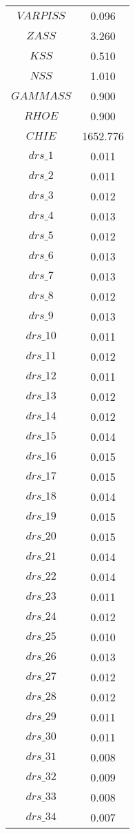 \begin{center}
\begin{longtable}{cc}
$VARPISS$ 	 & 	 0.096 \\
$ZASS$ 	 & 	 3.260 \\
$KSS$ 	 & 	 0.510 \\
$NSS$ 	 & 	 1.010 \\
$GAMMASS$ 	 & 	 0.900 \\
$RHOE$ 	 & 	 0.900 \\
$CHIE$ 	 & 	 1652.776 \\
$drs\_1$ 	 & 	 0.011 \\
$drs\_2$ 	 & 	 0.011 \\
$drs\_3$ 	 & 	 0.012 \\
$drs\_4$ 	 & 	 0.013 \\
$drs\_5$ 	 & 	 0.012 \\
$drs\_6$ 	 & 	 0.013 \\
$drs\_7$ 	 & 	 0.013 \\
$drs\_8$ 	 & 	 0.012 \\
$drs\_9$ 	 & 	 0.013 \\
$drs\_10$ 	 & 	 0.011 \\
$drs\_11$ 	 & 	 0.012 \\
$drs\_12$ 	 & 	 0.011 \\
$drs\_13$ 	 & 	 0.012 \\
$drs\_14$ 	 & 	 0.012 \\
$drs\_15$ 	 & 	 0.014 \\
$drs\_16$ 	 & 	 0.015 \\
$drs\_17$ 	 & 	 0.015 \\
$drs\_18$ 	 & 	 0.014 \\
$drs\_19$ 	 & 	 0.015 \\
$drs\_20$ 	 & 	 0.015 \\
$drs\_21$ 	 & 	 0.014 \\
$drs\_22$ 	 & 	 0.014 \\
$drs\_23$ 	 & 	 0.011 \\
$drs\_24$ 	 & 	 0.012 \\
$drs\_25$ 	 & 	 0.010 \\
$drs\_26$ 	 & 	 0.013 \\
$drs\_27$ 	 & 	 0.012 \\
$drs\_28$ 	 & 	 0.012 \\
$drs\_29$ 	 & 	 0.011 \\
$drs\_30$ 	 & 	 0.011 \\
$drs\_31$ 	 & 	 0.008 \\
$drs\_32$ 	 & 	 0.009 \\
$drs\_33$ 	 & 	 0.008 \\
$drs\_34$ 	 & 	 0.007 \\

\end{longtable}
\end{center}
